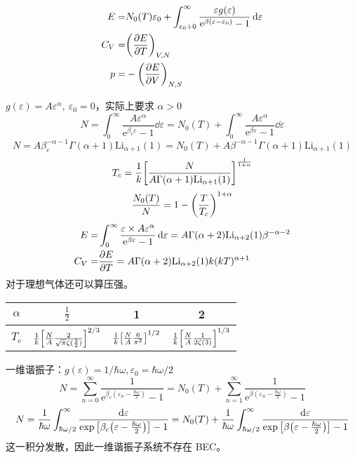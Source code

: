 \begin{align*}
    E = & N_0(T) \varepsilon_0 + \int_{\varepsilon_0 + 0}^{\infty} \frac{\varepsilon g(\varepsilon)}{\mathrm{e}^{\beta (\varepsilon - \varepsilon_0)} - 1} \dd{\varepsilon}\\
    C_V = & \qty(\pdv{E}{T})_{V, N}\\
    p = & - \qty(\pdv{E}{V})_{N, S}
\end{align*}

\begin{framed}
$g(\varepsilon) = A \varepsilon^{\alpha},\ \varepsilon_0 = 0$，实际上要求 $\alpha > 0$ \[
N = \int_0^{\infty} \frac{A \varepsilon^{\alpha}}{\mathrm{e}^{\beta_c \varepsilon} - 1} \dd{\varepsilon} = N_0(T) + \int_0^{\infty} \frac{A \varepsilon^{\alpha}}{\mathrm{e}^{\beta \varepsilon} - 1} \dd{\varepsilon}
\] \[
N = A \beta_c ^{-\alpha -1} \Gamma (\alpha +1) \text{Li}_{\alpha +1}(1) = N_0(T) + A \beta ^{-\alpha -1} \Gamma (\alpha +1) \text{Li}_{\alpha +1}(1)
\] \[
T_c = \frac{1}{k} \qty[\frac{N}{A \Gamma (\alpha +1) \text{Li}_{\alpha +1}(1)}]^{\frac{1}{1 + \alpha}}
\]  \[
\frac{N_0(T)}{N} = 1 - \qty(\frac{T}{T_c})^{1 + \alpha}
\] \begin{align*}
E = & \int_0^{\infty} \frac{\varepsilon \times A \varepsilon^{\alpha}}{\mathrm{e}^{\beta \varepsilon} - 1} \dd{\varepsilon} = A \Gamma (\alpha +2) \text{Li}_{\alpha +2}(1) \beta ^{-\alpha -2}\\
C_V = & \pdv{E}{T} = A \Gamma (\alpha +2) \text{Li}_{\alpha +2}(1) k (k T)^{\alpha + 1}
\end{align*} 对于理想气体还可以算压强。
\end{framed}

\begin{table}[H]
    \centering
    \begin{tabular}{|c|c|c|c|}
        \hline
        $\alpha$ & $\frac{1}{2}$ & 1 & 2 \\
        \hline
        $T_c$ & $\frac{1}{k} \qty[\frac{N}{A} \frac{2}{\sqrt{\pi} \zeta(\frac{3}{2})}]^{2/3}$ & $\frac{1}{k} \qty[\frac{N}{A} \frac{6}{\pi^2}]^{1/2}$ & $\frac{1}{k} \qty[\frac{N}{A} \frac{1}{2 \zeta (3)}]^{1/3}$\\
        \hline
    \end{tabular}
\end{table}

\begin{framed}
一维谐振子：$g(\varepsilon) = 1 / \hbar \omega, \varepsilon_0 = \hbar \omega / 2$ 
\[
N = \sum_{n = 0}^{\infty} \frac{1}{\mathrm{e}^{\beta_c (\varepsilon_n - \frac{\hbar \omega}{2})} - 1} = N_0(T) + \sum_{n = 1}^{\infty} \frac{1}{\mathrm{e}^{\beta (\varepsilon_n - \frac{\hbar \omega}{2})} - 1}
\]
\[
N = \frac{1}{\hbar \omega} \int_{\hbar \omega / 2}^{\infty} \frac{\dd{\varepsilon}}{\exp \qty[\beta_c \qty(\varepsilon - \frac{\hbar \omega}{2})] - 1} = N_0(T) + \frac{1}{\hbar \omega} \int_{\hbar \omega / 2}^{\infty} \frac{\dd{\varepsilon}}{\exp \qty[\beta \qty(\varepsilon - \frac{\hbar \omega}{2})] - 1}
\] 这一积分发散，因此一维谐振子系统不存在 BEC。
\end{framed}

